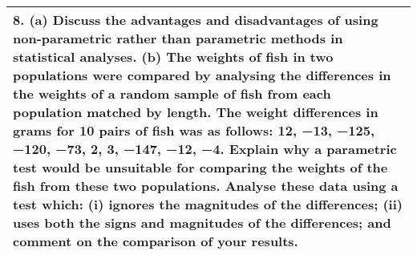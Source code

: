 \documentclass[a4paper,12pt]{article}
\begin{document}
\begin{table}[ht!]
 
\centering
 
\begin{tabular}{|p{15cm}|}
 
\hline  

8. (a) Discuss the advantages and disadvantages of using non-parametric rather than parametric methods in statistical analyses.
(b) The weights of fish in two populations were compared by analysing the differences in the weights of a random sample of fish from each population matched by length.  The weight differences in grams for 10 pairs of fish was as follows:
12,   −13,   −125,   −120,   −73,   2,   3,   −147,   −12,   −4.
Explain why a parametric test would be unsuitable for comparing the weights of the fish from these two populations.
Analyse these data using a test which:
(i) ignores the magnitudes of the differences;
(ii) uses both the signs and magnitudes of the differences;
and comment on the comparison of your results.

\\ \hline
  
\end{tabular}

\end{table}

\end{document}
